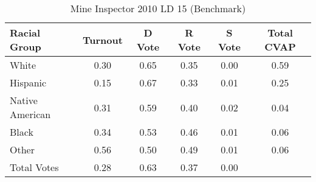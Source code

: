 \begin{table}[htb]
\begin{center}
\caption{Mine Inspector 2010 LD 15 (Benchmark)}
\label{smine_cvap_ld_15_benchmark}
\begin{tabular}{lccccc}
  \hline
Racial Group & Turnout & D Vote & R Vote & S Vote & Total CVAP \\ 
  \hline
White & 0.30 & 0.65 & 0.35 & 0.00 & 0.59 \\ 
  Hispanic & 0.15 & 0.67 & 0.33 & 0.01 & 0.25 \\ 
  Native American & 0.31 & 0.59 & 0.40 & 0.02 & 0.04 \\ 
  Black & 0.34 & 0.53 & 0.46 & 0.01 & 0.06 \\ 
  Other & 0.56 & 0.50 & 0.49 & 0.01 & 0.06 \\ 
  Total Votes & 0.28 & 0.63 & 0.37 & 0.00 &  \\ 
   \hline
\end{tabular}
\end{center}
\end{table}
